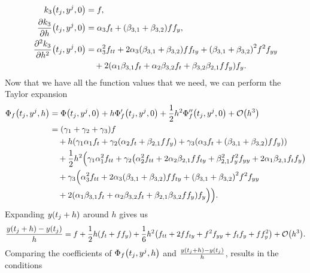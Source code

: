 \documentclass{exercise}
\begin{document}
\begin{enumerate}
\begin{align*}
			k_3\parentheses*{t_j, y^j, 0} &= f,\\
			\frac{\partial k_3}{\partial h}\parentheses*{t_j, y^j, 0} &= \alpha_3 f_t + \parentheses*{\beta_{3, 1} + \beta_{3, 2}}ff_y,\\
			\frac{\partial^2 k_3}{\partial h^2}\parentheses*{t_j, y^j, 0} &= \alpha_3^2 f_{tt} + 2\alpha_3 \parentheses*{\beta_{3, 1} + \beta_{3, 2}}ff_{ty} + \parentheses*{\beta_{3, 1} + \beta_{3, 2}}^2 f^2 f_{yy}\\
			&\quad + 2\parentheses*{\alpha_1 \beta_{3, 1}f_t + \alpha_2 \beta_{3, 2}f_t + \beta_{3, 2}\beta_{2, 1}ff_y}f_y.
		\end{align*}
		Now that we have all the function values that we need, we can perform the Taylor expansion
		\begin{align*}
			\Phi_f\parentheses*{t_j, y^j, h} &= \Phi\parentheses*{t_j, y^j, 0} + h\Phi_f'\parentheses*{t_j, y^j, 0} + \frac{1}{2}h^2 \Phi_f''\parentheses*{t_j, y^j, 0} + \mathcal{O}\parentheses*{h^3}\\
			&= \parentheses*{\gamma_1 + \gamma_2 + \gamma_3}f\\
			&\quad + h\parentheses*{\gamma_1 \alpha_1 f_t + \gamma_2 \parentheses*{\alpha_2 f_t + \beta_{2, 1}ff_y} + \gamma_3 \parentheses*{\alpha_3 f_t + \parentheses*{\beta_{3, 1} + \beta_{3, 2}}ff_y}}\\
			&\quad + \frac{1}{2}h^2 \Bigl(\gamma_1 \alpha_1^2 f_{tt} + \gamma_2\parentheses*{\alpha_2^2 f_{tt} + 2\alpha_2 \beta_{2, 1}ff_{ty} + \beta_{2, 1}^2 f_y^2 f_{yy} + 2\alpha_1 \beta_{2, 1}f_t f_y}\\
			&\quad + \gamma_3 \Bigl(\alpha_3^2 f_{tt} + 2\alpha_3 \parentheses*{\beta_{3, 1} + \beta_{3, 2}}ff_{ty} + \parentheses*{\beta_{3, 1} + \beta_{3, 2}}^2 f^2 f_{yy}\\
			&\quad + 2\parentheses*{\alpha_1 \beta_{3, 1}f_t + \alpha_2 \beta_{3, 2}f_t + \beta_{2, 1}\beta_{3, 2}ff_y}f_y\Bigr)\Bigr).
		\end{align*}
		Expanding \(y\parentheses*{t_j + h}\) around \(h\) gives us
		\begin{align*}
			\frac{y\parentheses*{t_j + h} - y\parentheses*{t_j}}{h} = f + \frac{1}{2}h\parentheses*{f_t + ff_y} + \frac{1}{6}h^2 \parentheses*{f_{tt} + 2ff_{ty} + f^2 f_{yy} + f_t f_y + ff_y^2} + \mathcal{O}\parentheses*{h^3}.
		\end{align*}
		Comparing the coefficients of \(\Phi_f\parentheses*{t_j, y^j, h}\) and \(\frac{y\parentheses*{t_j + h} - y\parentheses*{t_j}}{h}\), results in the conditions
		{
			\setlength{\belowdisplayskip}{5pt}
}
\end{enumerate}
\end{document}
